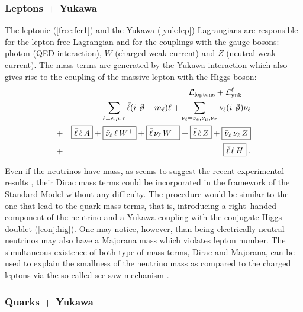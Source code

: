 \documentclass[12pt]{report}
\def\text#1{{\scriptstyle\mathrm{#1}}}
\newcommand{\lag}{{\cal L}}
\newcommand{\dels}{\not \! \partial}
\begin{document}

\subsubsection{Leptons + Yukawa} \indent

The leptonic (\ref{free:fer1}) and the Yukawa (\ref{yuk:lep})
Lagrangians are responsible for the lepton free Lagrangian and for the
couplings with the gauge bosons: photon (QED interaction), $W$ (charged
weak current) and $Z$ (neutral weak current). The mass terms are
generated by the Yukawa interaction which also gives rise to the coupling
of the massive lepton with the Higgs boson:
\begin{eqnarray}
&&\lag_{\text{leptons}} + \lag_{\text{yuk}}^\ell = 
\label{lep:yuk} \\
&& \sum_{\ell = e, \mu, \tau} \bar{\ell} (i \dels - m_\ell) \ell + 
\sum_{\nu_\ell = \nu_e, \nu_\mu, \nu_\tau} 
\bar{\nu}_\ell (i \dels) \nu_\ell  
\nonumber \\  
&+& \fbox{$\bar{\ell} \, \ell \, A$} 
+ \fbox{$\bar{\nu}_\ell \, \ell \, W^+$} + 
\fbox{$\bar{\ell} \, \nu_\ell \, W^-$} 
+ \fbox{$\bar{\ell} \, \ell \, Z$} + \fbox{$\bar{\nu}_\ell \, \nu_\ell \, Z$} 
\nonumber \\  
&+& \fbox{$\bar{\ell} \, \ell \, H$} \; .\nonumber
\end{eqnarray}

Even if the neutrinos have mass, as seems to suggest the recent 
experimental results \cite{SolarNeutrino:99,AtmosphericNeutrino:99},
their Dirac mass terms could be incorporated in the framework of the
Standard Model without any difficulty. The procedure would be similar
to the one that lead to the quark mass terms, that is, introducing a
right--handed component of the neutrino and a Yukawa coupling with
the conjugate Higgs doublet (\ref{conj:hig}). One may notice,
however, than being electrically  neutral neutrinos may also have a
Majorana mass which violates lepton number. The simultaneous
existence of both type of mass terms, Dirac and Majorana, can be used
to explain the smallness of the  neutrino mass as compared to the
charged leptons via the so called see-saw mechanism \cite{Seesaw:79}.


\subsubsection{Quarks + Yukawa} \indent
\end{document}
